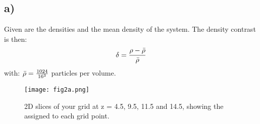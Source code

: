 \subsection{a)}
Given are the densities and the mean density of the system. The density contrast is then:
\begin{align}
    \delta = \frac{\rho - \Bar{\rho}}{\Bar{\rho}}
\end{align}
with: $\Bar{\rho} = \frac{1024}{16^3}$ particles per volume. 

\begin{figure}[h!]
    \centering
    \texttt{[image: fig2a.png]}
    \caption{2D slices of your grid at z = 4.5, 9.5, 11.5 and 14.5, showing the assigned to each grid point.}
\end{figure}




